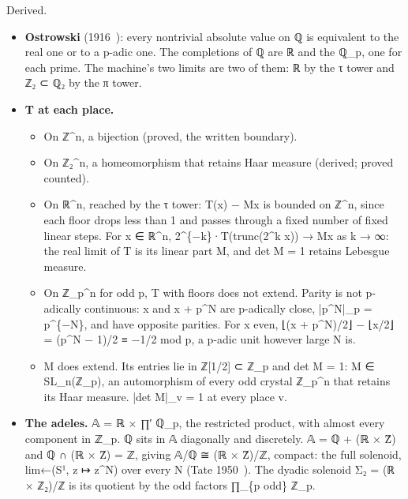 Derived.

\begin{itemize}
\item \textbf{Ostrowski} (1916~\cite{src:Ostrowski-1916}): every nontrivial absolute value on ℚ is equivalent to the real one or to a p-adic one. The completions of ℚ are ℝ and the ℚ\_\allowbreak{}p, one for each prime. The machine's two limits are two of them: ℝ by the τ tower and ℤ₂ ⊂ ℚ₂ by the π tower.
\item \textbf{T at each place.}

\begin{itemize}
\item On ℤ\textasciicircum{}n, a bijection (proved, the written boundary).
\item On ℤ₂\textasciicircum{}n, a homeomorphism that retains Haar measure (derived; proved counted).
\item On ℝ\textasciicircum{}n, reached by the τ tower: T(x) − Mx is bounded on ℤ\textasciicircum{}n, since each floor drops less than 1 and passes through a fixed number of fixed linear steps. For x ∈ ℝ\textasciicircum{}n, 2\textasciicircum{}\{−k\}·T(trunc(2\textasciicircum{}k x)) → Mx as k → ∞: the real limit of T is its linear part M, and det M = 1 retains Lebesgue measure.
\item On ℤ\_\allowbreak{}p\textasciicircum{}n for odd p, T with floors does not extend. Parity is not p-adically continuous: x and x + p\textasciicircum{}N are p-adically close, |p\textasciicircum{}N|\_\allowbreak{}p = p\textasciicircum{}\{−N\}, and have opposite parities. For x even, ⌊(x + p\textasciicircum{}N)/2⌋ − ⌊x/2⌋ = (p\textasciicircum{}N − 1)/2 ≡ −1/2 mod p, a p-adic unit however large N is.
\item M does extend. Its entries lie in ℤ[1/2] ⊂ ℤ\_\allowbreak{}p and det M = 1: M ∈ SL\_\allowbreak{}n(ℤ\_\allowbreak{}p), an automorphism of every odd crystal ℤ\_\allowbreak{}p\textasciicircum{}n that retains its Haar measure. |det M|\_\allowbreak{}v = 1 at every place v.
\end{itemize}
\item \textbf{The adeles.} 𝔸 = ℝ × ∏′ ℚ\_\allowbreak{}p, the restricted product, with almost every component in ℤ\_\allowbreak{}p. ℚ sits in 𝔸 diagonally and discretely. 𝔸 = ℚ + (ℝ × Ẑ) and ℚ ∩ (ℝ × Ẑ) = ℤ, giving 𝔸/ℚ ≅ (ℝ × Ẑ)/ℤ, compact: the full solenoid, lim←(S¹, z ↦ z\textasciicircum{}N) over every N (Tate 1950~\cite{src:Tate-1950}). The dyadic solenoid Σ₂ = (ℝ × ℤ₂)/ℤ is its quotient by the odd factors ∏\_\allowbreak{}\{p odd\} ℤ\_\allowbreak{}p.

\end{itemize}
